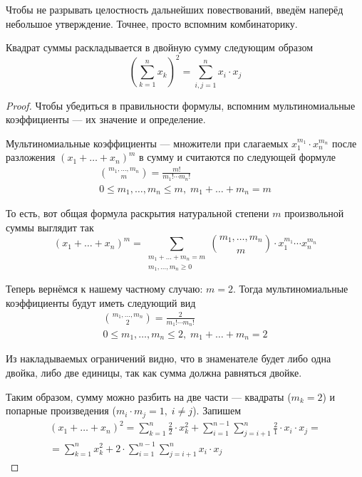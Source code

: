 Чтобы не разрывать целостность дальнейших повествований, введём наперёд
небольшое утверждение. Точнее, просто вспомним комбинаторику.
\begin{affirmation}\label{affirmation:squaredSum}
  Квадрат суммы раскладывается в двойную сумму следующим образом
  $$\left( \sum_{k=1}^n x_k \right)^2 = \sum_{i, j = 1}^{n} x_i \cdot x_j$$
\end{affirmation}
\begin{proof}
  Чтобы убедиться в правильности формулы, вспомним мультиномиальные
  коэффициенты --- их значение и определение.

  Мультиномиальные коэффициенты --- множители при слагаемых
  $x_1^{m_1} \cdot x_n^{m_n}$ после разложения
  $\left( x_1 + \dots + x_n \right)^m$ в сумму и считаются по следующей
  формуле \cite[с.~23]{Grimaldi}
  \begin{align*}
      {m_1, \dots, m_n \choose m} = \frac{m!}{m_1! \cdots m_n!} \\
      0 \le m_1, \dots, m_n \le m,\; m_1 + \dots + m_n = m
  \end{align*}

  То есть, вот общая формула раскрытия натуральной степени $m$ произвольной
  суммы выглядит так
  $$\left( x_1 + \dots + x_n \right)^m
      = \sum_{
          \substack{m_1 + \dots + m_n = m \\
          m_1, \dots, m_n \ge 0}}
      {m_1, \dots, m_n \choose m} \cdot x_1^{m_1} \cdots x_n^{m_n}$$

  Теперь вернёмся к нашему частному случаю: $m=2$. Тогда мультиномиальные
  коэффициенты будут иметь следующий вид
  \begin{align*}
  {m_1, \dots, m_n \choose 2} = \frac{2}{m_1! \cdots m_n!} \\
      0 \le m_1, \dots, m_n \le 2,\; m_1 + \dots + m_n = 2
  \end{align*}

  Из накладываемых ограничений видно, что в знаменателе будет либо одна
  двойка, либо две единицы, так как сумма должна равняться двойке.

  Таким образом, сумму можно разбить на две части --- квадраты ($m_k = 2$)
  и попарные произведения ($m_i \cdot m_j = 1,\; i \neq j$). Запишем
  \begin{equation}\label{eq:squaredSumStart}
      \begin{split}
      \left( x_1 + \dots + x_n \right)^2
          = \sum_{k=1}^{n} \frac{2}{2} \cdot x_k^2
        + \sum_{i=1}^{n-1}
            \sum_{j=i+1}^n \frac{2}{1} \cdot x_i \cdot x_j = \\
          = \sum_{k=1}^{n} x_k^2
        + 2 \cdot \sum_{i=1}^{n-1} \sum_{j=i+1}^n x_i \cdot x_j
      \end{split}
  \end{equation}


\end{proof}
